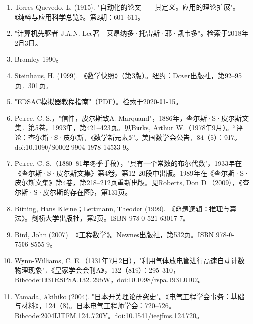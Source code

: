 \begin{enumerate}
\item Torres Quevedo, L. (1915). "自动化的论文——其定义。应用的理论扩展"。《纯粹与应用科学总览》。第2期：601–611。
\item "计算机先驱者 J.A.N. Lee著 - 莱昂纳多·托雷斯·耶·凯韦多"。检索于2018年2月3日。
\item Bromley 1990。
\item Steinhaus, H. (1999). 《数学快照》（第3版）。纽约：Dover出版社，第92–95页，301页。
\item "EDSAC模拟器教程指南"（PDF）。检索于2020-01-15。
\item Peirce, C. S.，"信件，皮尔斯致A. Marquand"，1886年，查尔斯·S·皮尔斯文集，第5卷，1993年，第421–423页。见Burks, Arthur W.（1978年9月）。“评论：查尔斯·S·皮尔斯，《数学新元素》”。美国数学会公告，84（5）：917。doi:10.1090/S0002-9904-1978-14533-9。
\item Peirce, C. S.（1880–81年冬季手稿），"具有一个常数的布尔代数"，1933年在《查尔斯·S·皮尔斯文集》第4卷，第12–20段中出版。1989年在《查尔斯·S·皮尔斯文集》第4卷，第218–212页重新出版。见Roberts, Don D.（2009），《查尔斯·S·皮尔斯的存在图》，第131页。
\item Büning, Hans Kleine；Lettmann, Theodor (1999). 《命题逻辑：推理与算法》。剑桥大学出版社，第2页。ISBN 978-0-521-63017-7。
\item Bird, John (2007). 《工程数学》。Newnes出版社，第532页。ISBN 978-0-7506-8555-9。
\item Wynn-Williams, C. E.（1931年7月2日），"利用气体放电管进行高速自动计数物理现象"，《皇家学会会刊A》，132（819）：295–310，Bibcode:1931RSPSA.132..295W，doi:10.1098/rspa.1931.0102。
\item Yamada, Akihiko (2004). "日本开关理论研究史"。《电气工程学会事务：基础与材料》，124（8）。日本电气工程师学会：720–726。Bibcode:2004IJTFM.124..720Y。doi:10.1541/ieejfms.124.720。
\end{enumerate}